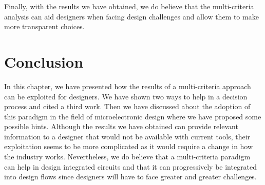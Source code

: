 Finally, with the results we have obtained, we do believe that the multi-criteria analysis can aid designers when facing design challenges and allow them to make more transparent choices.

\section{Conclusion}
In this chapter, we have presented how the results of a multi-criteria approach can be exploited for designers. We have shown two ways to help in a decision process and cited a third work. Then we have discussed about the adoption of this paradigm in the field of microelectronic design where we have proposed some possible hints. Although the results we have obtained can provide relevant information to a designer that would not be available with current tools, their exploitation seems to be more complicated as it would require a change in how the industry works. Nevertheless, we do believe that a multi-criteria paradigm can help in design integrated circuits and that it can progressively be integrated into design flows since designers will have to face greater and greater challenges.